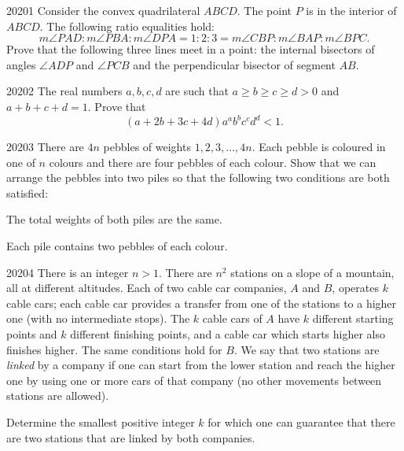 
\begin{problem}{2020}{1}
Consider the convex quadrilateral $ABCD$. The point $P$ is in the interior of $ABCD$. The following ratio equalities hold:
\[
    m\angle PAD:m\angle PBA:m\angle DPA
    = 1:2:3 = m\angle CBP:m\angle BAP:m\angle BPC.
\]
Prove that the following three lines meet in a point: the internal bisectors of angles $\angle ADP$ and $\angle PCB$ and the perpendicular bisector of segment $AB$.
\end{problem}

\begin{problem}{2020}{2}
The real numbers $a, b, c, d$ are such that $a\geq b\geq c\geq d>0$ and $a+b+c+d=1$. Prove that
\[
    (a+2b+3c+4d)a^ab^bc^cd^d<1.
\]
\end{problem}

\begin{problem}{2020}{3}
There are $4n$ pebbles of weights $1, 2, 3, \dots, 4n$. Each pebble is coloured in one of $n$ colours and there are four pebbles of each colour. Show that we can arrange the pebbles into two piles so that the following two conditions are both satisfied:
\begin{problemitems}
    \item The total weights of both piles are the same.
    \item Each pile contains two pebbles of each colour.
\end{problemitems}
\end{problem}

\begin{problem}{2020}{4}
There is an integer $n>1$. There are $n^2$ stations on a slope of a mountain, all at different altitudes. Each of two cable car companies, $A$ and $B$, operates $k$ cable cars; each cable car provides a transfer from one of the stations to a higher one (with no intermediate stops). The $k$ cable cars of $A$ have $k$ different starting points and $k$ different finishing points, and a cable car which starts higher also finishes higher. The same conditions hold for $B$. We say that two stations are \emph{linked} by a company if one can start from the lower station and reach the higher one by using one or more cars of that company (no other movements between stations are allowed).

Determine the smallest positive integer $k$ for which one can guarantee that there are two stations that are linked by both companies.
\end{problem}

